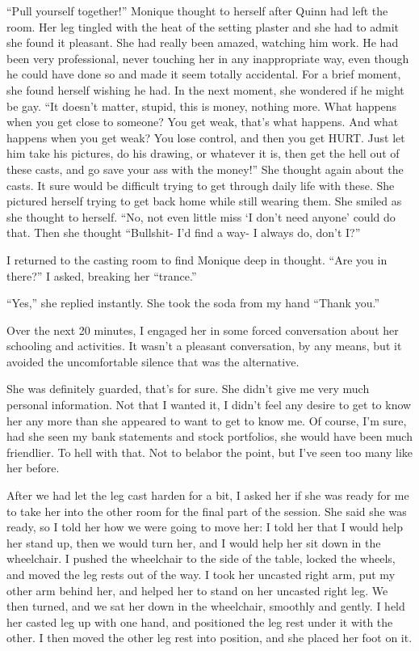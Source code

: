 \begin{thought}
``Pull yourself together!'' Monique thought to herself after Quinn had left the room. Her
leg tingled with the heat of the setting plaster and she had to admit she found it pleasant. She
had really been amazed, watching him work. He had been very professional, never touching her in
any inappropriate way, even though he could have done so and made it seem totally accidental.
For a brief moment, she found herself wishing he had. In the next moment, she wondered if he
might be gay. ``It doesn't matter, stupid, this is money, nothing more. What happens when you
get close to someone? You get weak, that's what happens. And what happens when you get weak? You
lose control, and then you get HURT. Just let him take his pictures, do his drawing, or whatever
it is, then get the hell out of these casts, and go save your ass with the money!'' She thought
again about the casts. It sure would be difficult trying to get through daily life with these.
She pictured herself trying to get back home while still wearing them. She smiled as she thought
to herself. ``No, not even little miss ‘I don't need anyone' could do that. Then she thought
``Bullshit- I'd find a way- I always do, don't I?''
\end{thought}

I returned to the casting room to find Monique deep in thought. ``Are you in there?'' I
asked, breaking her ``trance.''

``Yes,'' she replied instantly. She took the soda from my hand ``Thank you.''

Over the next 20 minutes, I engaged her in some forced conversation about her schooling and
activities. It wasn't a pleasant conversation, by any means, but it avoided the uncomfortable
silence that was the alternative.

She was definitely guarded, that's for sure. She didn't give me very much personal
information. Not that I wanted it, I didn't feel any desire to get to know her any more than she
appeared to want to get to know me. Of course, I'm sure, had she seen my bank statements and
stock portfolios, she would have been much friendlier. To hell with that. Not to belabor the
point, but I've seen too many like her before.

After we had let the leg cast harden for a bit, I asked her if she was ready for me to take
her into the other room for the final part of the session. She said she was ready, so I told her
how we were going to move her: I told her that I would help her stand up, then we would turn
her, and I would help her sit down in the wheelchair. I pushed the wheelchair to the side of the
table, locked the wheels, and moved the leg rests out of the way. I took her uncasted right arm,
put my other arm behind her, and helped her to stand on her uncasted right leg. We then turned,
and we sat her down in the wheelchair, smoothly and gently. I held her casted leg up with one
hand, and positioned the leg rest under it with the other. I then moved the other leg rest into
position, and she placed her foot on it.

